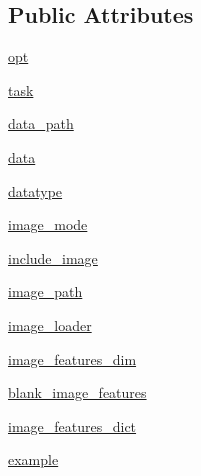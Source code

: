 \subsection*{Public Attributes}
\begin{DoxyCompactItemize}
\item 
\hyperlink{classparlai_1_1core_1_1teachers_1_1AbstractImageTeacher_aa7ca0df94cb27a11487e40343cc84de6}{opt}
\item 
\hyperlink{classparlai_1_1core_1_1teachers_1_1AbstractImageTeacher_a78dca77e43183d22d75140ca113d821c}{task}
\item 
\hyperlink{classparlai_1_1core_1_1teachers_1_1AbstractImageTeacher_a9fb2d3ab4b52f70872460c624bad1218}{data\+\_\+path}
\item 
\hyperlink{classparlai_1_1core_1_1teachers_1_1AbstractImageTeacher_a4015f3b73718e13896bb464378a269f1}{data}
\item 
\hyperlink{classparlai_1_1core_1_1teachers_1_1AbstractImageTeacher_a335cba069093a1e1cff8f73fad9f11d1}{datatype}
\item 
\hyperlink{classparlai_1_1core_1_1teachers_1_1AbstractImageTeacher_a72abb2921076e7597cc946275983028b}{image\+\_\+mode}
\item 
\hyperlink{classparlai_1_1core_1_1teachers_1_1AbstractImageTeacher_a0e4ee3692e19e0f1df2fef8f21d058ab}{include\+\_\+image}
\item 
\hyperlink{classparlai_1_1core_1_1teachers_1_1AbstractImageTeacher_aff2a7f405e051f014ece5cc124aa170c}{image\+\_\+path}
\item 
\hyperlink{classparlai_1_1core_1_1teachers_1_1AbstractImageTeacher_aaf426bd12c83e8f8d5a217481cbf854b}{image\+\_\+loader}
\item 
\hyperlink{classparlai_1_1core_1_1teachers_1_1AbstractImageTeacher_a708601003f79d10c98a1933501ce658f}{image\+\_\+features\+\_\+dim}
\item 
\hyperlink{classparlai_1_1core_1_1teachers_1_1AbstractImageTeacher_a0c48c489fee91d94cf8d62b902bd6b27}{blank\+\_\+image\+\_\+features}
\item 
\hyperlink{classparlai_1_1core_1_1teachers_1_1AbstractImageTeacher_a67fc5068ab7e2c1c718614cc737d6a75}{image\+\_\+features\+\_\+dict}
\item 
\hyperlink{classparlai_1_1core_1_1teachers_1_1AbstractImageTeacher_a404b2e622780e94083ba9539ebaab609}{example}
\end{DoxyCompactItemize}


